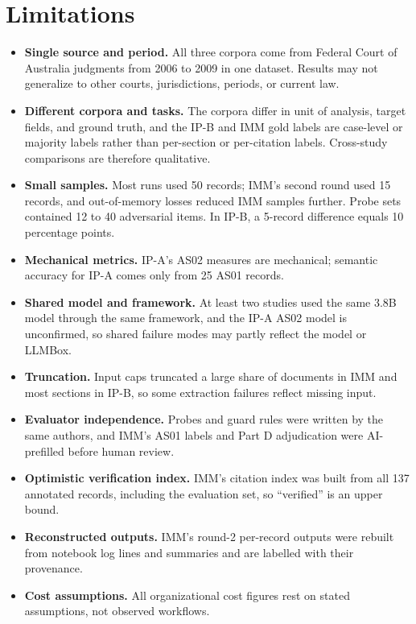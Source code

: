\documentclass[10pt,letterpaper]{article}
\begin{document}
\section{Limitations}
\begin{itemize}
\item \textbf{Single source and period.} All three corpora come from Federal Court of Australia judgments from 2006 to 2009 in one dataset. Results may not generalize to other courts, jurisdictions, periods, or current law.
\item \textbf{Different corpora and tasks.} The corpora differ in unit of analysis, target fields, and ground truth, and the IP-B and IMM gold labels are case-level or majority labels rather than per-section or per-citation labels. Cross-study comparisons are therefore qualitative.
\item \textbf{Small samples.} Most runs used 50 records; IMM's second round used 15 records, and out-of-memory losses reduced IMM samples further. Probe sets contained 12 to 40 adversarial items. In IP-B, a 5-record difference equals 10 percentage points.
\item \textbf{Mechanical metrics.} IP-A's AS02 measures are mechanical; semantic accuracy for IP-A comes only from 25 AS01 records.
\item \textbf{Shared model and framework.} At least two studies used the same 3.8B model through the same framework, and the IP-A AS02 model is unconfirmed, so shared failure modes may partly reflect the model or LLMBox.
\item \textbf{Truncation.} Input caps truncated a large share of documents in IMM and most sections in IP-B, so some extraction failures reflect missing input.
\item \textbf{Evaluator independence.} Probes and guard rules were written by the same authors, and IMM's AS01 labels and Part D adjudication were AI-prefilled before human review.
\item \textbf{Optimistic verification index.} IMM's citation index was built from all 137 annotated records, including the evaluation set, so ``verified'' is an upper bound.
\item \textbf{Reconstructed outputs.} IMM's round-2 per-record outputs were rebuilt from notebook log lines and summaries and are labelled with their provenance.
\item \textbf{Cost assumptions.} All organizational cost figures rest on stated assumptions, not observed workflows.
\end{itemize}
\end{document}
